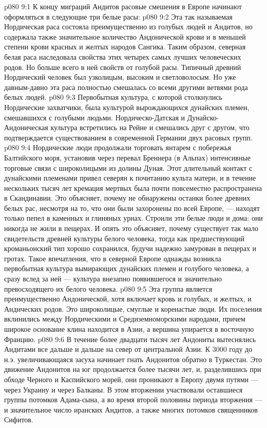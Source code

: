 \vs p080 9:1 К концу миграций Андитов расовые смешения в Европе начинают оформляться в следующие три белые расы:
\vs p080 9:2 \bibnobreakspace {} Эта так называемая Нордическая раса состояла преимущественно из голубых людей и Андитов, но содержала также значительное количество Андонической крови и в меньшей степени крови красных и желтых народов Сангика. Таким образом, северная белая раса наследовала свойства этих четырех самых лучших человеческих родов. Но больше всего в ней свойств от голубой расы. Типичный древний Нордический человек был узколицым, высоким и светловолосым. Но уже давным\hyp{}давно эта раса полностью смешалась со всеми другими ветвями рода белых людей.
\vs p080 9:3 Первобытная культура, с которой столкнулись Нордические захватчики, была культурой вырождающихся дунайских племен, смешавшихся с голубыми людьми. Нордическо\hyp{}Датская и Дунайско\hyp{}Андоническая культура встретились на Рейне и смешались друг с другом, что подтверждается существованием в современной Германии двух расовых групп.
\vs p080 9:4 Нордические люди продолжали торговать янтарем с побережья Балтийского моря, установив через перевал Бреннера (в Альпах) интенсивные торговые связи с широколицыми из долины Дуная. Этот длительный контакт с дунайскими племенами привел северян к почитанию культа матери, и в течение нескольких тысяч лет кремация мертвых была почти повсеместно распространена в Скандинавии. Это объясняет, почему не обнаружены останки более древних белых рас, несмотря на то, что они были захоронены по всей Европе, --- находят только пепел в каменных и глиняных урнах. Строили эти белые люди и дома: они никогда не жили в пещерах. И опять это объясняет, почему существует так мало свидетельств древней культуры белого человека, тогда как предшествующий кроманьонский тип хорошо сохранился, будучи надежно замурован в пещерах и гротах. Такое впечатления, что в северной Европе однажды возникла первобытная культура вымирающих дунайских племен и голубого человека, а сразу вслед за ней --- культура внезапно появившегося и значительно превосходящего их белого человека.
\vs p080 9:5 \pc {}\bibnobreakspace {} Эта группа является преимущественно Андонической, хотя включает кровь и голубых, и желтых, и Андических родов. Это широколицые, смуглые и коренастые люди. Их поселения вклинились между Нордическими и Средиземноморскими народами, причем широкое основание клина находится в Азии, а вершина упирается в восточную Францию.
\vs p080 9:6 В течение более двадцати тысяч лет Андониты вытеснялись Андитами все дальше и дальше на север от центральной Азии. К 3000 году до н.э. увеличивающаяся засуха начинает гнать Андонитов обратно в Туркестан. Это движение Андонитов на юг продолжается более тысячи лет, и, разделившись при обходе Черного и Каспийского морей, они проникают в Европу двумя путями --- через Украину и через Балканы. В этом вторжении участвовали оставшиеся группы потомков Адама\hyp{}сына, а во время второй половины периода вторжения --- и значительное число иранских Андитов, а также многих потомков священников Сифитов.
